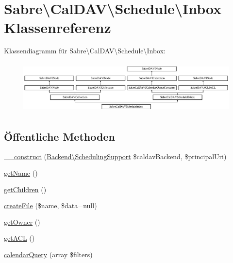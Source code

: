 \hypertarget{class_sabre_1_1_cal_d_a_v_1_1_schedule_1_1_inbox}{}\section{Sabre\textbackslash{}Cal\+D\+AV\textbackslash{}Schedule\textbackslash{}Inbox Klassenreferenz}
\label{class_sabre_1_1_cal_d_a_v_1_1_schedule_1_1_inbox}
Klassendiagramm für Sabre\textbackslash{}Cal\+D\+AV\textbackslash{}Schedule\textbackslash{}Inbox\+:\begin{figure}[H]
\begin{center}
\leavevmode
\includegraphics[height=2.745098cm]{class_sabre_1_1_cal_d_a_v_1_1_schedule_1_1_inbox}
\end{center}
\end{figure}
\subsection*{Öffentliche Methoden}
\begin{DoxyCompactItemize}
\item 
\mbox{\hyperlink{class_sabre_1_1_cal_d_a_v_1_1_schedule_1_1_inbox_a904643dd961e3b98cf2d3b60ef7fb626}{\+\_\+\+\_\+construct}} (\mbox{\hyperlink{interface_sabre_1_1_cal_d_a_v_1_1_backend_1_1_scheduling_support}{Backend\textbackslash{}\+Scheduling\+Support}} \$caldav\+Backend, \$principal\+Uri)
\item 
\mbox{\hyperlink{class_sabre_1_1_cal_d_a_v_1_1_schedule_1_1_inbox_a17cc7b8dc7473e91f76d807d42562cf5}{get\+Name}} ()
\item 
\mbox{\hyperlink{class_sabre_1_1_cal_d_a_v_1_1_schedule_1_1_inbox_afd7af5894f052f0a2eb86455065fe495}{get\+Children}} ()
\item 
\mbox{\hyperlink{class_sabre_1_1_cal_d_a_v_1_1_schedule_1_1_inbox_a8c56a7ba0178ffd33c6886a248bde08b}{create\+File}} (\$name, \$data=null)
\item 
\mbox{\hyperlink{class_sabre_1_1_cal_d_a_v_1_1_schedule_1_1_inbox_aaae98d89fe203488407265e19ec7e875}{get\+Owner}} ()
\item 
\mbox{\hyperlink{class_sabre_1_1_cal_d_a_v_1_1_schedule_1_1_inbox_a032faf190d9a2cb08354ecaeca948e8f}{get\+A\+CL}} ()
\item 
\mbox{\hyperlink{class_sabre_1_1_cal_d_a_v_1_1_schedule_1_1_inbox_ac6cfa0cf27a7ed24ab31747623c62269}{calendar\+Query}} (array \$filters)
\end{DoxyCompactItemize}
